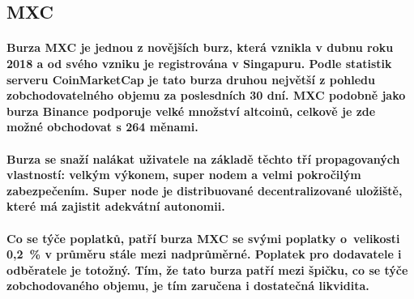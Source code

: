 \documentclass[thesis=B,czech]{FITthesis}[2019/03/21]
\begin{document}
\subsection{MXC}
\paragraph{
Burza MXC je jednou z novějších burz, která vznikla v dubnu roku 2018 a od svého vzniku je registrována v Singapuru. Podle statistik serveru CoinMarketCap je tato burza druhou největší z pohledu zobchodovatelného objemu za poslesdních 30 dní. \cite{coinmarketcap} MXC podobně jako burza Binance podporuje velké množství altcoinů, celkově je zde možné obchodovat s 264 měnami. \cite{mxc_coins}
}
\paragraph{
Burza se snaží nalákat uživatele na základě těchto tří propagovaných vlastností: velkým výkonem, super nodem a velmi pokročilým zabezpečením. Super node je distribuované decentralizované uložiště, které má zajistit adekvátní autonomii.
}
\paragraph{
Co se týče poplatků, patří burza MXC se svými poplatky o~velikosti 0,2~\% v průměru stále mezi nadprůměrné. Poplatek pro dodavatele i odběratele je totožný. Tím, že tato burza patří mezi špičku, co se týče zobchodovaného objemu, je tím zaručena i dostatečná likvidita. \cite{cryptowisser_mxc} 
}
\end{document}
